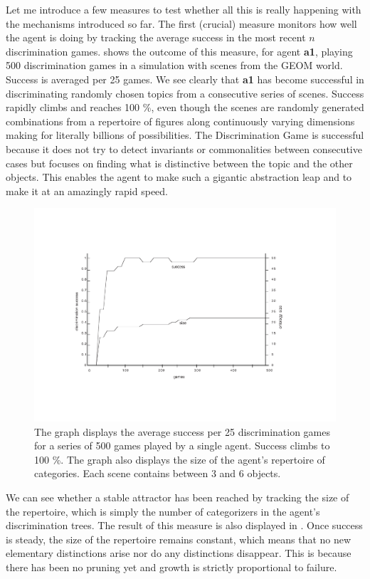 Let me introduce a few measures 
to test whether all this is really happening with the 
mechanisms introduced so far.
The first (crucial) measure monitors 
how well the agent is doing by tracking
the average success in the most recent $n$ discrimination games. 
 shows the outcome of this measure, for 
agent {\bf a1}, playing 500 discrimination games in a
simulation with scenes from the GEOM world. 
Success is averaged per 25 games. We see clearly that {\bf a1}
has become successful in discriminating randomly chosen topics
from a consecutive series of scenes. Success rapidly climbs and
reaches 100 \%, even though the scenes are randomly
generated combinations from a repertoire of figures
along continuously varying 
dimensions making for literally billions of possibilities. 
The Discrimination Game is successful because it does 
not try to detect invariants or commonalities between consecutive 
cases but focuses on finding what is distinctive between the topic 
and the other objects. This enables the agent to make
such a gigantic abstraction leap and to make it at an amazingly 
rapid speed. 
\begin{figure}[htbp]
  \centerline{\includegraphics[width=.70\textwidth]{chap4/figs/avsuc}}
\caption{\label{avsuc} The graph displays the 
average success per 25 discrimination games for a
series of 500 games played by a single agent. Success climbs
to 100 \%. The graph also displays the size of the 
agent's repertoire of categories. Each scene contains
between 3 and 6 objects.}
\end{figure}

We can see whether a stable attractor has been reached by 
tracking the size of the repertoire, which is
simply the number of 
categorizers in the agent's discrimination trees. 
The result of this measure is also displayed in 
. Once success is steady, the
size of the repertoire remains 
constant, which means that no new 
elementary distinctions arise nor do any distinctions
disappear. This is because there has been no pruning yet and 
growth is strictly proportional to failure. 

